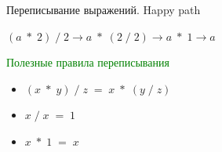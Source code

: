 \documentclass[aspectratio=169
  , xcolor={svgnames}
  , russian  %
  ]{beamer}
\begin{document}
\begin{frame}{Переписывание выражений. Happy path}
{
    \Huge{ \centering
    $(a \; *\; 2)\; / \;2 \rightarrow a \;*\; (2\; /\; 2) \rightarrow a \;*\; 1 \rightarrow a$
    }
    
    \vspace{1cm} %
    
    {\fontsize{16.1}{12}\selectfont \textcolor{green}{Полезные правила переписывания}}
    {\fontsize{16.1}{12}\selectfont %
    \begin{itemize}
        \item $(x\; * \;y) \;/ \;z \;= \;x\; * \;(y \;/ \;z)$
        \item $x \; / \; x \; = \; 1$
        \item $x \; * \; 1 \; = \; x$ 
    \end{itemize}
    }
}
\end{frame}
\end{document}

